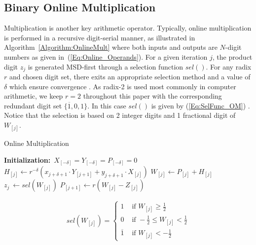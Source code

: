 \documentclass[conference]{IEEEtran}
\begin{document}
\subsection{Binary Online Multiplication}
Multiplication is another key arithmetic operator. Typically, online multiplication is performed in a recursive digit-serial manner, as illustrated in Algorithm~\ref{Algorithm:OnlineMult} \cite{Ercegovac_OnlineMult} where both inputs and outputs are $N$-digit numbers as given in~(\ref{Eq:Online_Operands}). For a given iteration $j$, the product digit $z_j$ is generated MSD-first through a selection function $sel()$. For any radix $r$ and chosen digit set, there exits an appropriate selection method and a value of $\delta$ which ensure convergence \cite{Ercegovac_OnlineMult}. As radix-2 is used most commonly in computer arithmetic, we keep $r=2$ throughout this paper with the corresponding redundant digit set $\{\overline{1},0,1\}$. In this case $sel()$ is given by (\ref{Eq:SelFunc_OM}) \cite{Oregon_OnlineNetwork}. Notice that the selection is based on 2 integer digits and 1 fractional digit of $W_{[j]}$.

\begin{algorithm}[tbp]
  \caption{Online Multiplication}  \label{Algorithm:OnlineMult}
  \begin{algorithmic}[1]
   \State \textbf{Initialization:}~$X_{[-\delta]}=Y_{[-\delta]}=P_{[-\delta]}=0$\vspace{.5ex}
    \vspace{.5ex}
        \State $H_{[j]} \leftarrow r^{-\delta}\left(x_{j+\delta+1}\cdot Y_{[j+1]}+y_{j+\delta+1}\cdot X_{[j]}\right)$\vspace{.5ex}
        \State $W_{[j]} \leftarrow P_{[j]} + H_{[j]}$\vspace{.5ex}
        \State $z_{j}~ \leftarrow sel(W_{[j]})$\vspace{.5ex}
        \State $P_{[j+1]} \leftarrow r\left(W_{[j]}-Z_{[j]}\right)$\vspace{.5ex}
    \EndFor
  \end{algorithmic}
\end{algorithm}

\begin{eqnarray}\label{Eq:SelFunc_OM}
  sel(W_{[j]})=\begin{cases}
    1 & \text{ if } W_{[j]} \geqslant \frac{1}{2} \\
    0 & \text{ if } -\frac{1}{2}\leqslant W_{[j]}<\frac{1}{2} \\
    \overline{1} & \text{ if } W_{[j]}<-\frac{1}{2}
  \end{cases}
\end{eqnarray}
\end{document}
